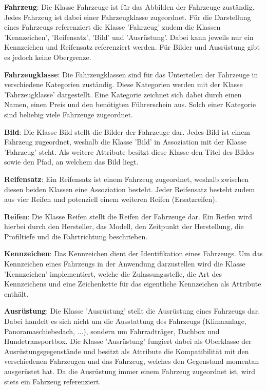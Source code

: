 \textbf{Fahrzeug}: Die Klasse Fahrzeuge ist für das Abbilden der Fahrzeuge zuständig. Jedes Fahrzeug ist dabei einer Fahrzeugklasse zugeordnet. Für die Darstellung eines Fahrzeugs referenziert die Klasse 'Fahrzeug' zudem die Klassen 'Kennzeichen', 'Reifensatz', 'Bild' und 'Ausrüstung'. Dabei kann jeweils nur ein Kennzeichen und Reifensatz referenziert werden. Für Bilder und Ausrüstung gibt es jedoch keine Obergrenze.

\textbf{Fahrzeugklasse}: Die Fahrzeugklassen sind für das Unterteilen der Fahrzeuge in verschiedene Kategorien zuständig. Diese Kategorien werden mit der Klasse 'Fahrzeugklasse' dargestellt. Eine Kategorie zeichnet sich dabei durch einen Namen, einen Preis und den benötigten Führerschein aus. Solch einer Kategorie sind beliebig viele Fahrzeuge zugeordnet.

\textbf{Bild}: Die Klasse Bild stellt die Bilder der Fahrzeuge dar. Jedes Bild ist einem Fahrzeug zugeordnet, weshalb die Klasse 'Bild' in Assoziation mit der Klasse 'Fahrzeug' steht. Als weitere Attribute besitzt diese Klasse den Titel des Bildes sowie den Pfad, an welchem das Bild liegt.

\textbf{Reifensatz}: Ein Reifensatz ist einem Fahrzeug zugeordnet, weshalb zwischen diesen beiden Klassen eine Assoziation besteht. Jeder Reifensatz besteht zudem aus vier Reifen und potenziell einem weiteren Reifen (Ersatzreifen).

\textbf{Reifen}: Die Klasse Reifen stellt die Reifen der Fahrzeuge dar. Ein Reifen wird hierbei durch den Hersteller, das Modell, den Zeitpunkt der Herstellung, die Profiltiefe und die Fahrtrichtung beschrieben.

\textbf{Kennzeichen}: Das Kennzeichen dient der Identifikation eines Fahrzeugs. Um das Kennzeichen eines Fahrzeugs in der Anwendung darzustellen wird die Klasse 'Kennzeichen' implementiert, welche die Zulassungsstelle, die Art des Kennzeichens und eine Zeichenkette für das eigentliche Kennzeichen als Attribute enthält.

\textbf{Ausrüstung}: Die Klasse 'Ausrüstung' stellt die Ausrüstung eines Fahrzeugs dar. Dabei handelt es sich nicht um die Ausstattung des Fahrzeugs (Klimaanlage, Panoramaschiebedach, ...), sondern um Fahrradträger, Dachbox und Hundetransportbox. Die Klasse 'Ausrüstung' fungiert dabei als Oberklasse der Ausrüstungsgegenstände und besitzt als Attribute die Kompatibilität mit den verschiedenen Fahrzeugen und das Fahrzeug, welches den Gegenstand momentan ausgerüstet hat. Da die Ausrüstung immer einem Fahrzeug zugeordnet ist, wird stets ein Fahrzeug referenziert.

